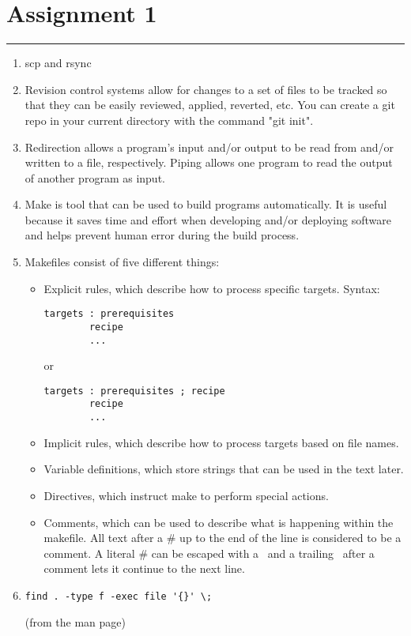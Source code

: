 \documentclass[letterpaper,10pt,fleqn]{article}
\numberwithin{equation}{section}
\begin{document}

\section*{Assignment 1}
\hrule

\begin{enumerate}
\item scp and rsync
\item Revision control systems allow for changes to a set of files to be tracked so that they can be easily reviewed, applied, reverted, etc.  You can create a git repo in your current directory with the command "git init".
\item Redirection allows a program's input and/or output to be read from and/or written to a file, respectively.  Piping allows one program to read the output of another program as input.
\item Make is tool that can be used to build programs automatically.  It is useful because it saves time and effort when developing and/or deploying software and helps prevent human error during the build process.
\item Makefiles consist of five different things:
\begin{itemize}
\item Explicit rules, which describe how to process specific targets.  Syntax:
\begin{verbatim}
targets : prerequisites
        recipe
        ...
\end{verbatim}
or
\begin{verbatim}
targets : prerequisites ; recipe
        recipe
        ...
\end{verbatim}
\item Implicit rules, which describe how to process targets based on file names.
\item Variable definitions, which store strings that can be used in the text later.
\item Directives, which instruct make to perform special actions.
\item Comments, which can be used to describe what is happening within the makefile. All text after a \# up to the end of the line is considered to be a comment. A literal \# can be escaped with a \, and a trailing \ after a comment lets it continue to the next line.
\end{itemize}
\item \begin{verbatim}find . -type f -exec file '{}' \;\end{verbatim} (from the man page)
\end{enumerate}
\end{document}

